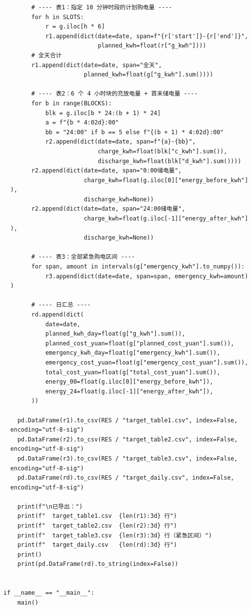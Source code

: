 \begin{verbatim}
        # ---- 表1：指定 10 分钟时段的计划购电量 ----
        for h in SLOTS:
            r = g.iloc[h * 6]
            r1.append(dict(date=date, span=f"{r['start']}-{r['end']}",
                           planned_kwh=float(r["g_kwh"])))
        # 全天合计
        r1.append(dict(date=date, span="全天",
                       planned_kwh=float(g["g_kwh"].sum())))

        # ---- 表2：6 个 4 小时块的充放电量 + 首末储电量 ----
        for b in range(BLOCKS):
            blk = g.iloc[b * 24:(b + 1) * 24]
            a = f"{b * 4:02d}:00"
            bb = "24:00" if b == 5 else f"{(b + 1) * 4:02d}:00"
            r2.append(dict(date=date, span=f"{a}-{bb}",
                           charge_kwh=float(blk["c_kwh"].sum()),
                           discharge_kwh=float(blk["d_kwh"].sum())))
        r2.append(dict(date=date, span="0:00储电量",
                       charge_kwh=float(g.iloc[0]["energy_before_kwh"]
  ),
                       discharge_kwh=None))
        r2.append(dict(date=date, span="24:00储电量",
                       charge_kwh=float(g.iloc[-1]["energy_after_kwh"]
  ),
                       discharge_kwh=None))

        # ---- 表3：全部紧急购电区间 ----
        for span, amount in intervals(g["emergency_kwh"].to_numpy()):
            r3.append(dict(date=date, span=span, emergency_kwh=amount)
  )

        # ---- 日汇总 ----
        rd.append(dict(
            date=date,
            planned_kwh_day=float(g["g_kwh"].sum()),
            planned_cost_yuan=float(g["planned_cost_yuan"].sum()),
            emergency_kwh_day=float(g["emergency_kwh"].sum()),
            emergency_cost_yuan=float(g["emergency_cost_yuan"].sum()),
            total_cost_yuan=float(g["total_cost_yuan"].sum()),
            energy_00=float(g.iloc[0]["energy_before_kwh"]),
            energy_24=float(g.iloc[-1]["energy_after_kwh"]),
        ))

    pd.DataFrame(r1).to_csv(RES / "target_table1.csv", index=False,
  encoding="utf-8-sig")
    pd.DataFrame(r2).to_csv(RES / "target_table2.csv", index=False,
  encoding="utf-8-sig")
    pd.DataFrame(r3).to_csv(RES / "target_table3.csv", index=False,
  encoding="utf-8-sig")
    pd.DataFrame(rd).to_csv(RES / "target_daily.csv", index=False,
  encoding="utf-8-sig")

    print(f"\n已导出：")
    print(f"  target_table1.csv  {len(r1):3d} 行")
    print(f"  target_table2.csv  {len(r2):3d} 行")
    print(f"  target_table3.csv  {len(r3):3d} 行（紧急区间）")
    print(f"  target_daily.csv   {len(rd):3d} 行")
    print()
    print(pd.DataFrame(rd).to_string(index=False))


if __name__ == "__main__":
    main()
\end{verbatim}

